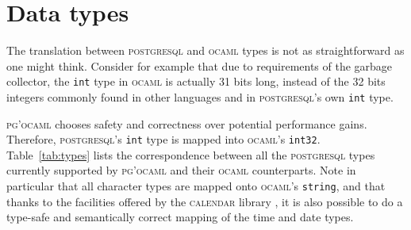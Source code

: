 \documentclass[11pt]{article}
\newcommand{\ocaml}{\textsc{ocaml}\xspace}
\newcommand{\postgresql}{\textsc{postgresql}\xspace}
\newcommand{\pgocaml}{\textsc{pg'ocaml}\xspace}
\newcommand{\calendar}{\textsc{calendar}\xspace}
\begin{document}

\section{Data types}
\label{sec:types}

The translation between \postgresql and \ocaml types is not as straightforward as one
might think.  Consider for example that due to requirements of the garbage collector,
the \texttt{int} type in \ocaml is actually 31 bits long, instead of the 32 bits
integers commonly found in other languages and in \postgresql's own \texttt{int} type.

\pgocaml chooses safety and correctness over potential performance gains.
Therefore, \postgresql's \texttt{int} type is mapped into \ocaml's \texttt{int32}.
Table~\ref{tab:types} lists the correspondence between all the \postgresql types
currently supported by \pgocaml and their \ocaml counterparts.  Note in particular
that all character types are mapped onto \ocaml's \texttt{string}, and that thanks to
the facilities offered by the \calendar library \cite{calendar}, it is also possible
to do a type-safe and semantically correct mapping of the time and date types.
\end{document}
